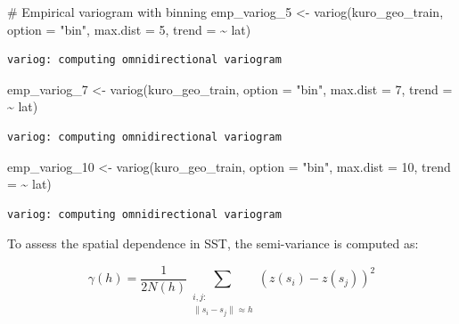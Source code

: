 \documentclass[
  11pt,
]{article}
\newenvironment{Shaded}{\begin{snugshade}}{\end{snugshade}}
\newcommand{\AttributeTok}[1]{\textcolor[rgb]{0.40,0.45,0.13}{#1}}
\newcommand{\CommentTok}[1]{\textcolor[rgb]{0.37,0.37,0.37}{#1}}
\newcommand{\DecValTok}[1]{\textcolor[rgb]{0.68,0.00,0.00}{#1}}
\newcommand{\FunctionTok}[1]{\textcolor[rgb]{0.28,0.35,0.67}{#1}}
\newcommand{\NormalTok}[1]{\textcolor[rgb]{0.00,0.23,0.31}{#1}}
\newcommand{\OtherTok}[1]{\textcolor[rgb]{0.00,0.23,0.31}{#1}}
\newcommand{\SpecialCharTok}[1]{\textcolor[rgb]{0.37,0.37,0.37}{#1}}
\newcommand{\StringTok}[1]{\textcolor[rgb]{0.13,0.47,0.30}{#1}}
\begin{document}
\begin{Shaded}
\begin{Highlighting}[]
\CommentTok{\# Empirical variogram with binning}
\NormalTok{emp\_variog\_5 }\OtherTok{\textless{}{-}} \FunctionTok{variog}\NormalTok{(kuro\_geo\_train, }\AttributeTok{option =} \StringTok{"bin"}\NormalTok{, }\AttributeTok{max.dist =} \DecValTok{5}\NormalTok{, }\AttributeTok{trend =} \SpecialCharTok{\textasciitilde{}}\NormalTok{ lat)}
\end{Highlighting}
\end{Shaded}

\begin{verbatim}
variog: computing omnidirectional variogram
\end{verbatim}

\begin{Shaded}
\begin{Highlighting}[]
\NormalTok{emp\_variog\_7 }\OtherTok{\textless{}{-}} \FunctionTok{variog}\NormalTok{(kuro\_geo\_train, }\AttributeTok{option =} \StringTok{"bin"}\NormalTok{, }\AttributeTok{max.dist =} \DecValTok{7}\NormalTok{, }\AttributeTok{trend =} \SpecialCharTok{\textasciitilde{}}\NormalTok{ lat)}
\end{Highlighting}
\end{Shaded}

\begin{verbatim}
variog: computing omnidirectional variogram
\end{verbatim}

\begin{Shaded}
\begin{Highlighting}[]
\NormalTok{emp\_variog\_10 }\OtherTok{\textless{}{-}} \FunctionTok{variog}\NormalTok{(kuro\_geo\_train, }\AttributeTok{option =} \StringTok{"bin"}\NormalTok{, }\AttributeTok{max.dist =} \DecValTok{10}\NormalTok{, }\AttributeTok{trend =} \SpecialCharTok{\textasciitilde{}}\NormalTok{ lat)}
\end{Highlighting}
\end{Shaded}

\begin{verbatim}
variog: computing omnidirectional variogram
\end{verbatim}

To assess the spatial dependence in SST, the semi-variance is computed
as:

\[
\gamma(h) = \frac{1}{2N(h)} \sum_{\substack{i,j: \\ \|s_i - s_j\| \approx h}} \left( z(s_i) - z(s_j) \right)^2
\]
\end{document}
